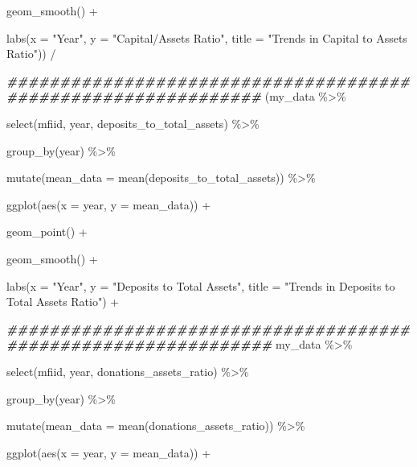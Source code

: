 \documentclass[a4paper,nobind]{templates/ociamthesis}
\newenvironment{Shaded}{\begin{snugshade}}{\end{snugshade}}
\newcommand{\AttributeTok}[1]{\textcolor[rgb]{0.77,0.63,0.00}{#1}}
\newcommand{\DocumentationTok}[1]{\textcolor[rgb]{0.56,0.35,0.01}{\textbf{\textit{#1}}}}
\newcommand{\FunctionTok}[1]{\textcolor[rgb]{0.00,0.00,0.00}{#1}}
\newcommand{\NormalTok}[1]{#1}
\newcommand{\SpecialCharTok}[1]{\textcolor[rgb]{0.00,0.00,0.00}{#1}}
\newcommand{\StringTok}[1]{\textcolor[rgb]{0.31,0.60,0.02}{#1}}
\renewenvironment{Shaded}
{
  \vspace{10pt}%
  \begin{snugshade}%
}{%
  \end{snugshade}%
  \vspace{8pt}%
}
\begin{document}
\begin{landscape}
\begin{Shaded}
\begin{Highlighting}[]
  \FunctionTok{geom\_smooth}\NormalTok{() }\SpecialCharTok{+} 
  
  \FunctionTok{labs}\NormalTok{(}\AttributeTok{x =} \StringTok{"Year"}\NormalTok{, }\AttributeTok{y =} \StringTok{"Capital/Assets Ratio"}\NormalTok{, }\AttributeTok{title =} \StringTok{"Trends in Capital to Assets Ratio"}\NormalTok{)) }\SpecialCharTok{/}

\DocumentationTok{\#\#\#\#\#\#\#\#\#\#\#\#\#\#\#\#\#\#\#\#\#\#\#\#\#\#\#\#\#\#\#\#\#\#\#\#\#\#\#\#\#\#\#\#\#\#\#\#\#\#\#\#\#\#\#\#\#\#\#\#\#\#}
\NormalTok{(my\_data }\SpecialCharTok{\%\textgreater{}\%} 
  
  \FunctionTok{select}\NormalTok{(mfiid, year, deposits\_to\_total\_assets) }\SpecialCharTok{\%\textgreater{}\%} 
  
  \FunctionTok{group\_by}\NormalTok{(year) }\SpecialCharTok{\%\textgreater{}\%} 
  
  \FunctionTok{mutate}\NormalTok{(}\AttributeTok{mean\_data =} \FunctionTok{mean}\NormalTok{(deposits\_to\_total\_assets)) }\SpecialCharTok{\%\textgreater{}\%} 
  
  \FunctionTok{ggplot}\NormalTok{(}\FunctionTok{aes}\NormalTok{(}\AttributeTok{x =}\NormalTok{ year, }\AttributeTok{y =}\NormalTok{ mean\_data)) }\SpecialCharTok{+} 
  
  \FunctionTok{geom\_point}\NormalTok{() }\SpecialCharTok{+} 
  
  \FunctionTok{geom\_smooth}\NormalTok{() }\SpecialCharTok{+} 
  
  \FunctionTok{labs}\NormalTok{(}\AttributeTok{x =} \StringTok{"Year"}\NormalTok{, }\AttributeTok{y =} \StringTok{"Deposits to Total Assets"}\NormalTok{, }\AttributeTok{title =} \StringTok{"Trends in Deposits to Total Assets Ratio"}\NormalTok{) }\SpecialCharTok{+}

\DocumentationTok{\#\#\#\#\#\#\#\#\#\#\#\#\#\#\#\#\#\#\#\#\#\#\#\#\#\#\#\#\#\#\#\#\#\#\#\#\#\#\#\#\#\#\#\#\#\#\#\#\#\#\#\#\#\#\#\#\#\#\#\#\#\#\#}
\NormalTok{my\_data }\SpecialCharTok{\%\textgreater{}\%} 
  
  \FunctionTok{select}\NormalTok{(mfiid, year, donations\_assets\_ratio) }\SpecialCharTok{\%\textgreater{}\%} 
  
  \FunctionTok{group\_by}\NormalTok{(year) }\SpecialCharTok{\%\textgreater{}\%} 
  
  \FunctionTok{mutate}\NormalTok{(}\AttributeTok{mean\_data =} \FunctionTok{mean}\NormalTok{(donations\_assets\_ratio)) }\SpecialCharTok{\%\textgreater{}\%} 
  
  \FunctionTok{ggplot}\NormalTok{(}\FunctionTok{aes}\NormalTok{(}\AttributeTok{x =}\NormalTok{ year, }\AttributeTok{y =}\NormalTok{ mean\_data)) }\SpecialCharTok{+} 
  

\end{Highlighting}
\end{Shaded}
\end{landscape}
\end{document}
